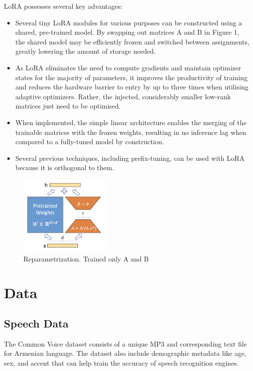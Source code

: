 \documentclass[conference]{IEEEtran}
\begin{document}
LoRA possesses several key advantages:
\begin{itemize}
    \item Several tiny LoRA modules for various purposes can be constructed using a shared, pre-trained model. By swapping out matrices A and B in Figure 1, the shared model may be efficiently frozen and switched between assignments, greatly lowering the amount of storage needed.
    \item As LoRA eliminates the need to compute gradients and maintain optimizer states for the majority of parameters, it improves the productivity of training and reduces the hardware barrier to entry by up to three times when utilising adaptive optimizers. Rather, the injected, considerably smaller low-rank matrices just need to be optimised.
    \item When implemented, the simple linear architecture enables the merging of the trainable matrices with the frozen weights, resulting in no inference lag when compared to a fully-tuned model by construction.
    \item Several previous techniques, including prefix-tuning, can be used with LoRA because it is orthogonal to them. \cite{hu2021}
\end{itemize}

\begin{figure}[ht]
\centering
\includegraphics[width=0.4\textwidth]{5.png}
\caption{Reparametrization. Trained only A and B}
\label{fig:whisper_asr_architecture}
\end{figure}

\section{Data}
\subsection{Speech Data}

The Common Voice dataset consists of a unique MP3 and corresponding text file for Armenian language. The dataset also include demographic metadata like age, sex, and accent that can help train the accuracy of speech recognition engines.
\end{document}
